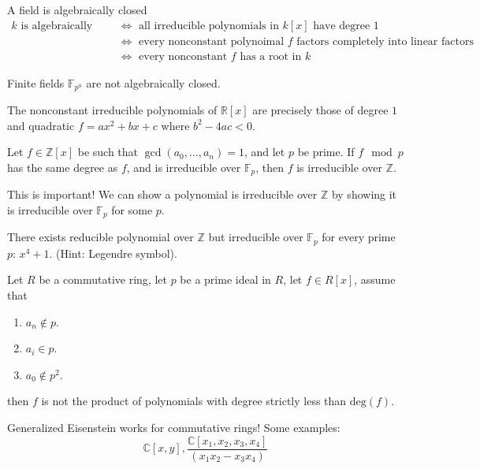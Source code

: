 \documentclass[openany]{book}
\newcommand{\R}{\mathbb{R}}
\newcommand{\Z}{\mathbb{Z}}
\newcommand{\C}{\mathbb{C}}
\newcommand{\F}{\mathbb{F}}
\begin{document}
\begin{prop}
    A field is algebraically closed 
    \begin{align*}
        k \text{ is algebraically closed}&\iff \text{ all irreducible polynomials in $k[x]$ have degree $1$}\\
        &\iff \text{ every nonconstant polynoimal $f$ factors completely into linear factors}\\
        &\iff \text{ every nonconstant $f$ has a root in $k$}
    \end{align*}
\end{prop}

\begin{thm}
    Finite fields $\F_{p^n}$ are not algebraically closed. 
    
\end{thm}

\begin{example}
    The nonconstant irreducible polynomials of $\R[x]$ are precisely those of degree $1$ and quadratic $f=ax^2+bx+c$ where $b^2-4ac<0$.
\end{example}


\begin{prop}
    Let $f\in\Z[x]$ be such that $\gcd(a_0,\dots,a_n)=1$, and let $p$ be prime. If $f\mod p$ has the same degree as $f$, and is irreducible over $\F_p$, then $f$ is irreducible over $\Z$.
\end{prop}
\begin{warn}
    This is important! We can show a polynomial is irreducible over $\Z$ by showing it is irreducible over $\F_p$ for some $p$.
\end{warn}

\begin{example}
    There exists reducible polynomial over $\Z$ but irreducible over $\F_p$ for every prime $p$: $x^4+1$. (Hint: Legendre symbol).
\end{example}

\begin{prop}
    Let $R$ be a commutative ring, let $p$ be a prime ideal in $R$, let $f\in R[x]$, assume that 
    \begin{enumerate}
        \item $a_n\not\in p$.
        \item $a_i\in p$.
        \item $a_0\not\in p^2$.
    \end{enumerate}
    then $f$ is not the product of polynomials with degree strictly less than $\text{deg}(f)$.
\end{prop}
\begin{warn}
    Generalized Eisenstein works for commutative rings! Some examples:
    \begin{equation*}
        \C[x,y], \frac{\C[x_1,x_2,x_3,x_4]}{(x_1x_2-x_3x_4)}
    \end{equation*}
\end{warn}
\end{document}
